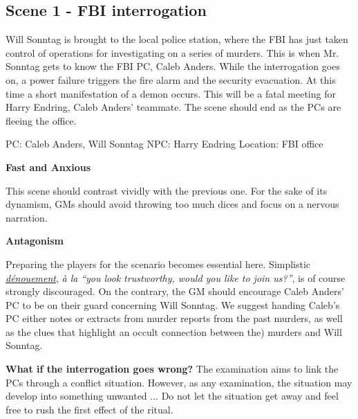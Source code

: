 \subsection{Scene 1 - FBI interrogation}

\begin{scene_summary}
Will Sonntag is brought to the local police station, where the FBI has just
taken control of operations for investigating on a series of murders. This is
when Mr. Sonntag gets to know the FBI PC, Caleb Anders. While the interrogation
goes on, a power failure triggers the fire alarm and the security evacuation.
At this time a short manifestation of a demon occurs. This will be a fatal
meeting for Harry Endring, Caleb Anders' teammate. The scene should end as the
PCs are fleeing the office.
\end{scene_summary}

\begin{scene_tag}
PC: Caleb Anders, Will Sonntag
NPC: Harry Endring
Location: FBI office
\end{scene_tag}

\begin{leading_idea}
{\bf Fast and Anxious}

This scene should contrast vividly with the previous one. For the sake of its
dynamism, GMs should avoid throwing too much dices and focus on a nervous
narration.

{\bf Antagonism}

Preparing the players for the scenario becomes essential here. Simplistic
\href{http://deadgentlemen.com/projects/the-gamers/the-gamers/}{\textit{d\'enouement}},
\textit{\`a la} \textit{``you look trustworthy, would you like to join us?''},
is of course strongly discouraged. On the contrary, the GM should encourage
Caleb Anders' PC to be on their guard concerning Will Sonntag.  We suggest
handing Caleb's PC either notes or extracts from murder reports from the past
murders, as well as the clues that highlight an occult connection between the)
murders and Will Sonntag.
\end{leading_idea}

\begin{sidenote}
{\bf What if the interrogation goes wrong?}
The examination aims to link the PCs through a conflict situation. However, as
any examination, the situation may develop into something unwanted ... Do not
let the situation get away and feel free to rush the first effect of
the ritual.
\end{sidenote}


